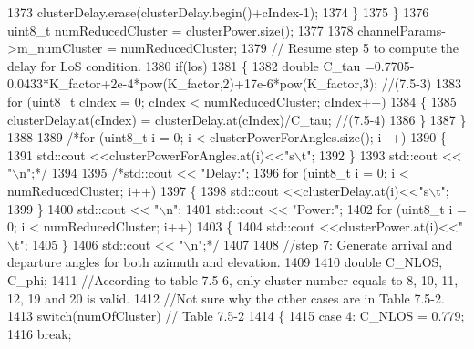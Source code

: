 \begin{DoxyCode}
1373                         clusterDelay.erase(clusterDelay.begin()+cIndex-1);
1374                 \}
1375         \}
1376         uint8\_t numReducedCluster = clusterPower.size();
1377 
1378         channelParams->m\_numCluster = numReducedCluster;
1379         \textcolor{comment}{// Resume step 5 to compute the delay for LoS condition.}
1380         \textcolor{keywordflow}{if}(los)
1381         \{
1382                 \textcolor{keywordtype}{double} C\_tau =0.7705-0.0433*K\_factor+2e-4*pow(K\_factor,2)+17e-6*pow(K\_factor,3); \textcolor{comment}{//(7.5-3)}
1383                 \textcolor{keywordflow}{for} (uint8\_t cIndex = 0; cIndex < numReducedCluster; cIndex++)
1384                 \{
1385                         clusterDelay.at(cIndex) = clusterDelay.at(cIndex)/C\_tau; \textcolor{comment}{//(7.5-4)}
1386                 \}
1387         \}
1388 
1389         \textcolor{comment}{/*for (uint8\_t i = 0; i < clusterPowerForAngles.size(); i++)}
1390 \textcolor{comment}{        \{}
1391 \textcolor{comment}{                std::cout <<clusterPowerForAngles.at(i)<<"s\(\backslash\)t";}
1392 \textcolor{comment}{        \}}
1393 \textcolor{comment}{        std::cout << "\(\backslash\)n";*/}
1394 
1395         \textcolor{comment}{/*std::cout << "Delay:";}
1396 \textcolor{comment}{        for (uint8\_t i = 0; i < numReducedCluster; i++)}
1397 \textcolor{comment}{        \{}
1398 \textcolor{comment}{                std::cout <<clusterDelay.at(i)<<"s\(\backslash\)t";}
1399 \textcolor{comment}{        \}}
1400 \textcolor{comment}{        std::cout << "\(\backslash\)n";}
1401 \textcolor{comment}{        std::cout << "Power:";}
1402 \textcolor{comment}{        for (uint8\_t i = 0; i < numReducedCluster; i++)}
1403 \textcolor{comment}{        \{}
1404 \textcolor{comment}{                std::cout <<clusterPower.at(i)<<"\(\backslash\)t";}
1405 \textcolor{comment}{        \}}
1406 \textcolor{comment}{        std::cout << "\(\backslash\)n";*/}
1407 
1408         \textcolor{comment}{//step 7: Generate arrival and departure angles for both azimuth and elevation.}
1409 
1410         \textcolor{keywordtype}{double} C\_NLOS, C\_phi;
1411         \textcolor{comment}{//According to table 7.5-6, only cluster number equals to 8, 10, 11, 12, 19 and 20 is valid.}
1412         \textcolor{comment}{//Not sure why the other cases are in Table 7.5-2.}
1413         \textcolor{keywordflow}{switch}(numOfCluster) \textcolor{comment}{// Table 7.5-2}
1414         \{
1415                 \textcolor{keywordflow}{case} 4: C\_NLOS = 0.779;
1416                                 \textcolor{keywordflow}{break};

\end{DoxyCode}
